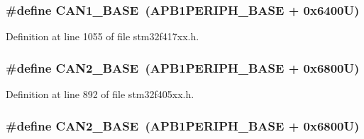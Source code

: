\subsubsection[{\texorpdfstring{C\+A\+N1\+\_\+\+B\+A\+SE}{CAN1_BASE}}]{\setlength{\rightskip}{0pt plus 5cm}\#define C\+A\+N1\+\_\+\+B\+A\+SE~({\bf A\+P\+B1\+P\+E\+R\+I\+P\+H\+\_\+\+B\+A\+SE} + 0x6400\+U)}\hypertarget{group___peripheral__registers__structures_gad8e45ea6c032d9fce1b0516fff9d8eaa}{}\label{group___peripheral__registers__structures_gad8e45ea6c032d9fce1b0516fff9d8eaa}


Definition at line 1055 of file stm32f417xx.\+h.

\subsubsection[{\texorpdfstring{C\+A\+N2\+\_\+\+B\+A\+SE}{CAN2_BASE}}]{\setlength{\rightskip}{0pt plus 5cm}\#define C\+A\+N2\+\_\+\+B\+A\+SE~({\bf A\+P\+B1\+P\+E\+R\+I\+P\+H\+\_\+\+B\+A\+SE} + 0x6800\+U)}\hypertarget{group___peripheral__registers__structures_gaf7b8267b0d439f8f3e82f86be4b9fba1}{}\label{group___peripheral__registers__structures_gaf7b8267b0d439f8f3e82f86be4b9fba1}


Definition at line 892 of file stm32f405xx.\+h.

\subsubsection[{\texorpdfstring{C\+A\+N2\+\_\+\+B\+A\+SE}{CAN2_BASE}}]{\setlength{\rightskip}{0pt plus 5cm}\#define C\+A\+N2\+\_\+\+B\+A\+SE~({\bf A\+P\+B1\+P\+E\+R\+I\+P\+H\+\_\+\+B\+A\+SE} + 0x6800\+U)}\hypertarget{group___peripheral__registers__structures_gaf7b8267b0d439f8f3e82f86be4b9fba1}{}\label{group___peripheral__registers__structures_gaf7b8267b0d439f8f3e82f86be4b9fba1}


